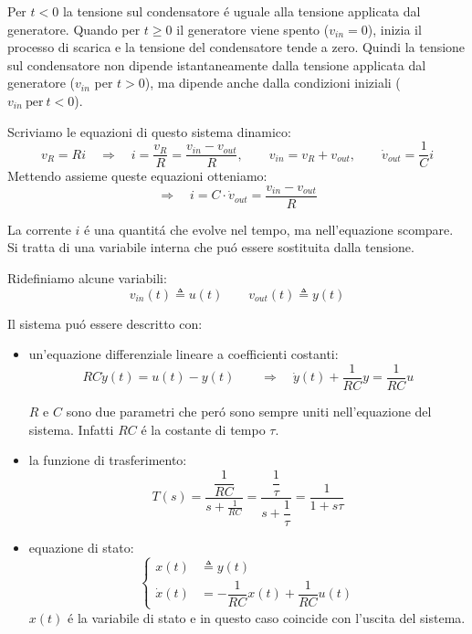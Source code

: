\documentclass[../main.tex]{subfiles}
\begin{document}
		Per $ t<0 $ la tensione sul condensatore \'e uguale alla tensione applicata dal generatore. Quando per $ t\geq0 $ il generatore viene spento ($ v_{in}=0 $), inizia il processo di scarica e la tensione del condensatore tende a zero. Quindi la tensione sul condensatore non dipende istantaneamente dalla tensione applicata dal generatore ($ v_{in} $ per $ t>0 $), ma dipende anche dalla condizioni iniziali ($ v_{in}\ \mbox{per}\ t<0$).
		
		Scriviamo le equazioni di questo sistema dinamico:
		\[
			v_R = Ri \quad\Rightarrow\quad i = \dfrac{v_R}{R} = \dfrac{v_{in}-v_{out}}{R} , \quad  \quad
			 v_{in} = v_R + v_{out} , \quad  \quad
			\dot v_{out} = \frac{1}{C}i 
		\]
		Mettendo assieme queste equazioni otteniamo:
		\[ \Rightarrow\quad i = C \cdot \dot v_{out} = \dfrac{v_{in}-v_{out}}{R} \]
		
		La corrente $ i $ \'e una quantit\'a che evolve nel tempo, ma nell'equazione scompare. Si tratta di una variabile interna che pu\'o essere sostituita dalla tensione.
		
		Ridefiniamo alcune variabili:
		\[ v_{in}(t) \triangleq u(t) \qquad v_{out}(t) \triangleq  y(t) \]
		
		Il sistema pu\'o essere descritto con:
		\begin{itemize}
			\item
				un'equazione differenziale lineare a coefficienti costanti:
				\[
					RC \dot y(t) = u(t) - y(t) \quad \quad
					\Rightarrow\quad  \dot y(t) + \dfrac{1}{RC} y = \dfrac{1}{RC} u
				\]
				
				$ R $ e $ C $ sono due parametri che per\'o sono sempre uniti nell'equazione del sistema. Infatti $ RC $ \'e la costante di tempo $ \tau $.
			\item
				la funzione di trasferimento:
				\[ T(s) = \dfrac{\dfrac{1}{RC}}{s+\frac{1}{RC}} = \dfrac{\dfrac{1}{\tau}}{s+\dfrac{1}{\tau}} = \dfrac{1}{1+s\tau} \] 
			\item
				equazione di stato:
				\[
					\begin{cases}
						x(t) &\triangleq y(t)\\
						\dot x(t) &= -\dfrac{1}{RC} x(t) + \dfrac{1}{RC} u(t)
					\end{cases}
				\]
				$ x(t) $ \'e la variabile di stato e in questo caso coincide con l'uscita del sistema.
		\end{itemize}
		
\end{document}
